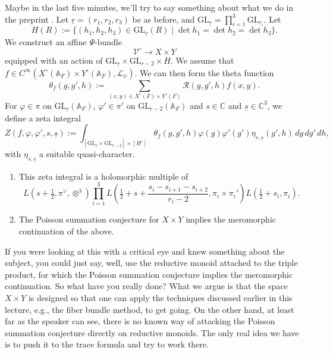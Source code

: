 \documentclass[reqno]{amsart} 
\numberwithin{theorem}{section}
\numberwithin{equation}{section}
\numberwithin{exercise}{section}
\begin{document}
Maybe in the last five minutes, we'll try to say something about what we do in the preprint \cite{2025arXiv2503.21648}.  Let $\underline{r} =(r_1, r_2, r_3)$ be as before, and $\mathrm{GL}_{\underline{r}} = \prod_{i = 1}^3\mathrm{GL}_{r_i}$.  Let
\begin{equation*}
  H(R) := \{(h_1, h_2, h_3) \in \mathrm{GL}_{\underline{r}}(R) \mid \det h_1 = \det h_2 = \det h_3\}.
\end{equation*}
We construct an affine $\Psi$-bundle
\begin{equation*}
  \mathcal{V}^{\circ} \rightarrow X \times Y
\end{equation*}
equipped with an action of $\mathrm{GL}_{\underline{r}} \times\mathrm{GL}_{\underline{r - 2}} \times H$.  We assume that $f \in C^\infty(X^{\circ}(\mathbb{A}_F) \times Y^{\circ}(\mathbb{A}_F), \mathcal{L}_\psi)$.  We can then form the theta function
\begin{equation*}
  \theta_f(g, g', h) := \sum_{
    (x, y) \in 
    X^{\circ}(F) \times Y^{\circ}(F)
  }
  \mathcal{R}(g, g', h) f(x, y).
\end{equation*}
For $\varphi \in \pi$ on $\mathrm{GL}_{\underline{r}}(\mathbb{A}_F)$, $\varphi ' \in \pi '$ on $\mathrm{GL}_{\underline{r - 2}}(\mathbb{A}_F)$ and $s \in \mathbb{C}$ and $\underline{s} \in \mathbb{C}^3$, we define a zeta integral
\begin{equation*}
  Z(f, \varphi, \varphi ', s, \underline{s})
  := \int_{[\mathrm{GL}_{\underline{r}} \times\mathrm{GL}_{\underline{r - 2}}] \times[H^{\circ}]}
  \theta_f(g, g', h)
  \varphi(g) \varphi '(g')
  \eta_{s, \underline{s}}(g', h)
  \, d g \, d g' \, d h,
\end{equation*}
with $\eta_{s, \underline{s}}$ a suitable quasi-character.
\begin{theorem}
  \begin{enumerate}
  \item This zeta integral is a holomorphic multiple of
    \begin{equation*}
      L(s + \tfrac{1}{2}, \pi^\vee, \otimes^3)
      \prod_{i = 1}^3 L(\tfrac{1}{2} + s + \frac{s_i - s_{i + 1} - s_{i + 2}}{r_i - 2}, \pi_i \times \pi_i ')
      L(\tfrac{1}{2} + s_i, \pi_i).
    \end{equation*}

  \item The Poisson summation conjecture for $X \times Y$ implies the meromorphic continuation of the above.
  \end{enumerate}
\end{theorem}
If you were looking at this with a critical eye and knew something about the subject, you could just say, well, use the reductive monoid attached to the triple product, for which the Poisson summation conjecture implies the meromorphic continuation.  So what have you really done?  What we argue is that the space $X \times Y$ is designed so that one can apply the techniques discussed earlier in this lecture, e.g., the fiber bundle method, to get going.  On the other hand, at least far as the speaker can see, there is no known way of attacking the Poisson summation conjecture directly on reductive monoids.  The only real idea we have is to push it to the trace formula and try to work there.
\end{document}
